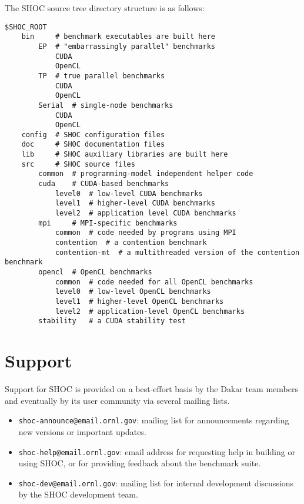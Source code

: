 \documentclass[11pt]{article}
\begin{document}
\pagebreak

The SHOC source tree directory structure is as follows:

\begin{Verbatim}[frame=single]
$SHOC_ROOT
    bin     # benchmark executables are built here
        EP  # "embarrassingly parallel" benchmarks
            CUDA
            OpenCL
        TP  # true parallel benchmarks
            CUDA
            OpenCL
        Serial  # single-node benchmarks
            CUDA
            OpenCL
    config  # SHOC configuration files
    doc     # SHOC documentation files
    lib     # SHOC auxiliary libraries are built here
    src     # SHOC source files
        common  # programming-model independent helper code
        cuda    # CUDA-based benchmarks
            level0  # low-level CUDA benchmarks
            level1  # higher-level CUDA benchmarks
            level2  # application level CUDA benchmarks
        mpi     # MPI-specific benchmarks
            common  # code needed by programs using MPI
            contention  # a contention benchmark
            contention-mt  # a multithreaded version of the contention benchmark
        opencl  # OpenCL benchmarks
            common  # code needed for all OpenCL benchmarks
            level0  # low-level OpenCL benchmarks
            level1  # higher-level OpenCL benchmarks
            level2  # application-level OpenCL benchmarks
        stability   # a CUDA stability test
\end{Verbatim}

\section{Support}\label{sec:support}

Support for SHOC is provided on a best-effort basis by the Dakar team members
and eventually by its user community via several mailing lists.
\begin{itemize}
\item \verb+shoc-announce@email.ornl.gov+: mailing list for announcements
regarding new versions or important updates.
\item \verb+shoc-help@email.ornl.gov+: email address for requesting
help in building or using SHOC, or for providing feedback about the benchmark 
suite.
\item \verb+shoc-dev@email.ornl.gov+: mailing list for internal 
development discussions by the SHOC development team.
\end{itemize}
\end{document}
